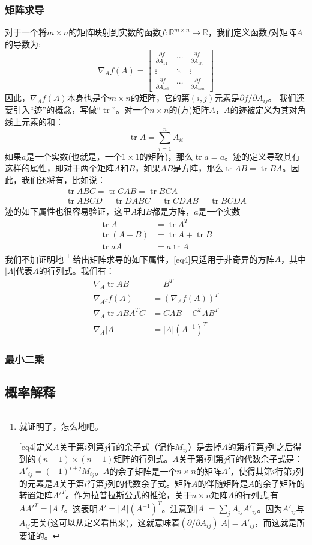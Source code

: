 \documentclass[hyperref, UTF8]{ctexart}
\DeclareMathOperator{\tr}{tr}
\begin{document}
\subsubsection{矩阵求导}
对于一个将$m \times n$的矩阵映射到实数的函数$f:\mathbb R^{m \times n} \mapsto \mathbb R$，我们定义函数$f$对矩阵$A$的导数为:
\begin{equation}
\nabla_Af(A) = 
\begin{bmatrix}
\frac{\partial f}{\partial A_{11}} & \cdots & \frac{\partial f}{\partial A_{1n}} \\
\vdots & \ddots & \vdots \\
\frac{\partial f}{\partial A_{m1}} & \cdots & \frac{\partial f}{\partial A_{mn}}
\end{bmatrix}
\end{equation}
因此，$\nabla_Af(A)$本身也是个$m \times n$的矩阵，它的第$(i, j)$元素是$\partial f/\partial A_{ij}$。
我们还要引入“迹”的概念，写做``$\tr$''。对一个$n \times n$的(方)矩阵$A$，$A$的迹被定义为其对角线上元素的和：
\begin{equation}
\tr A = \sum_{i = 1}^nA_{ii}
\end{equation}
如果$a$是一个实数(也就是，一个$1 \times 1$的矩阵)，那么$\tr a = a$。迹的定义导致其有这样的属性，即对于两个矩阵$A$和$B$，如果$AB$是方阵，那么$\tr AB = \tr BA$。因此，我们还将有，比如说：
\begin{gather*}
\tr ABC = \tr CAB = \tr BCA \\
\tr ABCD = \tr DABC = \tr CDAB = \tr BCDA
\end{gather*}
迹的如下属性也很容易验证，这里$A$和$B$都是方阵，$a$是一个实数
\begin{align}
\tr A &= \tr A^T \\
\tr (A + B) &= \tr A + \tr B \\
\tr aA &= a\tr A
\end{align}
我们不加证明地
\footnote{就证明了，怎么地吧。

\eqref{eq4}定义$A$关于第$i$列第$j$行的余子式（记作$M_{ij}$）是去掉$A$的第$i$行第$j$列之后得到的$(n − 1)\times(n − 1)$矩阵的行列式。$A$关于第$i$列第$j$行的代数余子式是：$A'_{ij} = (-1)^{i+j}M_{ij}$。$A$的余子矩阵是一个$n \times n$的矩阵$A'$，使得其第$i$行第$j$列的元素是$A$关于第$i$行第$j$列的代数余子式。矩阵$A$的伴随矩阵是$A$的余子矩阵的转置矩阵$A'^T$。作为拉普拉斯公式的推论，关于$n \times n$矩阵$A$的行列式,有$AA'^T = |A|I$。这表明$A' = |A|(A^{-1})^T$。注意到$|A| = \sum_jA_{ij}A'_{ij}$。因为$A'_{ij}$与$A_{ij}$无关(这可以从定义看出来)，这就意味着$(\partial/\partial A_{ij})|A| = A'_{ij}$，而这就是所要证的。}
给出矩阵求导的如下属性，\eqref{eq4}只适用于非奇异的方阵$A$，其中$|A|$代表$A$的行列式。我们有：
\begin{align}
\nabla_A\tr AB &= B^T \\
\nabla_{A^T}f(A) &= (\nabla_Af(A))^T \\
\nabla_A\tr ABA^TC &= CAB + C^TAB^T \\
\nabla_A|A| &= |A|(A^{-1})^T \label{eq4}
\end{align}

\subsubsection{最小二乘}

\subsection{概率解释}
\end{document}
